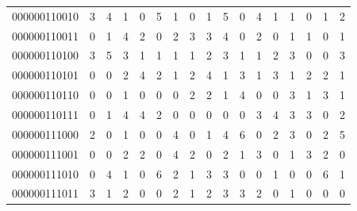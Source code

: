 \documentclass[10pt,a4paper]{article}
\begin{document}
\begin{longtable}{ |c|c|c|c|c|c|c|c|c|c|c|c|c|c|c|c|c| }
    000000110010              & 3                            & 4                                & 1                            & 0                              & 5   & 1   & 0   & 1   & 5   & 0   & 4   & 1   & 1   & 0   & 1   & 2   \\
    000000110011              & 0                            & 1                                & 4                            & 2                              & 0   & 2   & 3   & 3   & 4   & 0   & 2   & 0   & 1   & 1   & 0   & 1   \\
    000000110100              & 3                            & 5                                & 3                            & 1                              & 1   & 1   & 1   & 2   & 3   & 1   & 1   & 2   & 3   & 0   & 0   & 3   \\
    000000110101              & 0                            & 0                                & 2                            & 4                              & 2   & 1   & 2   & 4   & 1   & 3   & 1   & 3   & 1   & 2   & 2   & 1   \\
    000000110110              & 0                            & 0                                & 1                            & 0                              & 0   & 0   & 2   & 2   & 1   & 4   & 0   & 0   & 3   & 1   & 3   & 1   \\
    000000110111              & 0                            & 1                                & 4                            & 4                              & 2   & 0   & 0   & 0   & 0   & 0   & 3   & 4   & 3   & 3   & 0   & 2   \\
    000000111000              & 2                            & 0                                & 1                            & 0                              & 0   & 4   & 0   & 1   & 4   & 6   & 0   & 2   & 3   & 0   & 2   & 5   \\
    000000111001              & 0                            & 0                                & 2                            & 2                              & 0   & 4   & 2   & 0   & 2   & 1   & 3   & 0   & 1   & 3   & 2   & 0   \\
    000000111010              & 0                            & 4                                & 1                            & 0                              & 6   & 2   & 1   & 3   & 3   & 0   & 0   & 1   & 0   & 0   & 6   & 1   \\
    000000111011              & 3                            & 1                                & 2                            & 0                              & 0   & 2   & 1   & 2   & 3   & 3   & 2   & 0   & 1   & 0   & 0   & 0   \\

\end{longtable}
\end{document}
